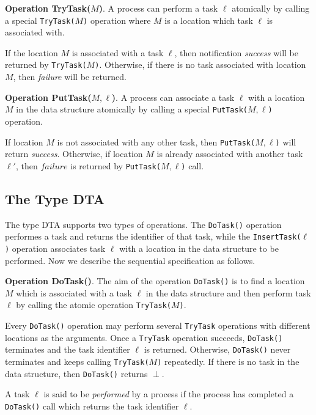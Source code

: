 \textbf{Operation TryTask($M$)}.
A process can perform a task $\ell$ atomically by calling a special
\texttt{TryTask(}$M$\texttt{)} operation where $M$ is a location which task $\ell$
is associated with.


If the location $M$ is associated with a task $\ell$, then notification \emph{success} will be returned
by \texttt{TryTask(}$M$\texttt{)}.
Otherwise, if there is no task associated with location $M$, then \emph{failure} will be
returned.

\textbf{Operation PutTask($M,\ell$)}.
A process can associate a task $\ell$ with a location $M$ in the data structure
atomically by calling a special \texttt{PutTask(}$M,\ell$\texttt{)} operation.

If location $M$ is not associated with any other task, then \texttt{PutTask(}$M,\ell$\texttt{)} will return \emph{success}.
Otherwise, if location $M$ is already associated with another task $\ell'$, then $failure$ is returned
by \texttt{PutTask(}$M,\ell$\texttt{)} call.

\subsection{The Type DTA}

The type DTA supports two types of operations. The \texttt{DoTask()} operation performes a task
and returns the identifier of that task, while the \texttt{InsertTask(}$\ell$\texttt{)} operation associates task
$\ell$ with a location in the data structure to be performed. Now we describe the sequential specification
as follows.

\textbf{Operation DoTask()}.
The aim of the operation \texttt{DoTask()} is to find a location $M$ which is associated with a task
$\ell$ in the data structure and then perform task $\ell$ by calling the atomic operation \texttt{TryTask(}$M$\texttt{)}.

Every \texttt{DoTask()} operation may perform several \texttt{TryTask} operations with different locations as the
arguments. Once a \texttt{TryTask} operation succeeds, \texttt{DoTask()} terminates and
the task identifier $\ell$ is returned. Otherwise, \texttt{DoTask()} never terminates and keeps calling
\texttt{TryTask(}$M$\texttt{)} repeatedly. If there is no task in the data structure,
then \texttt{DoTask()} returns $\perp$.

A task $\ell$ is said to be \emph{performed} by a process if the process has completed a \texttt{DoTask()} call
which returns the task identifier $\ell$.

